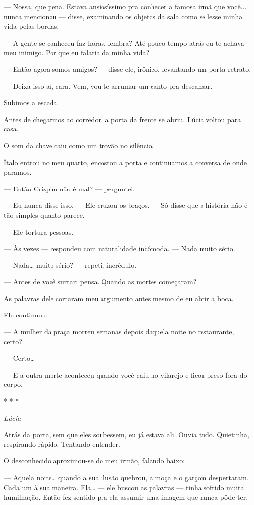 — Nossa, que pena. Estava ansiosíssimo pra conhecer a famosa irmã que você... nunca mencionou — disse, examinando os objetos da sala como se lesse minha vida pelas bordas.

— A gente se conheceu faz horas, lembra? Até pouco tempo atrás eu te achava meu inimigo. Por que eu falaria da minha vida?

— Então agora somos amigos? — disse ele, irônico, levantando um porta-retrato.

— Deixa isso aí, cara. Vem, vou te arrumar um canto pra descansar.

Subimos a escada.

Antes de chegarmos ao corredor, a porta da frente se abriu.  
Lúcia voltou para casa.

O som da chave caiu como um trovão no silêncio.

\bigskip

Ítalo entrou no meu quarto, encostou a porta e continuamos a conversa de onde paramos.

— Então Crispim não é mal? — perguntei.

— Eu nunca disse isso. — Ele cruzou os braços. — Só disse que a história não é tão simples quanto parece.

— Ele tortura pessoas.

— Às vezes — respondeu com naturalidade incômoda. — Nada muito sério.

— Nada… muito sério? — repeti, incrédulo.

— Antes de você surtar: pensa. Quando as mortes começaram?

As palavras dele cortaram meu argumento antes mesmo de eu abrir a boca.

Ele continuou:

— A mulher da praça morreu semanas depois daquela noite no restaurante, certo?

— Certo…

— E a outra morte aconteceu quando você caiu no vilarejo e ficou preso fora do corpo.

\begin{center}
* * *

\textit{Lúcia}
\end{center}

Atrás da porta, sem que eles soubessem, eu já estava ali.
Ouvia tudo.
Quietinha, respirando rápido.  
Tentando entender.

O desconhecido aproximou-se do meu irmão, falando baixo:

— Aquela noite… quando a sua ilusão quebrou, a moça e o garçom despertaram.  
Cada um à sua maneira.  
Ela… — ele buscou as palavras — tinha sofrido muita humilhação. Então fez sentido pra ela assumir uma imagem que nunca pôde ter.


